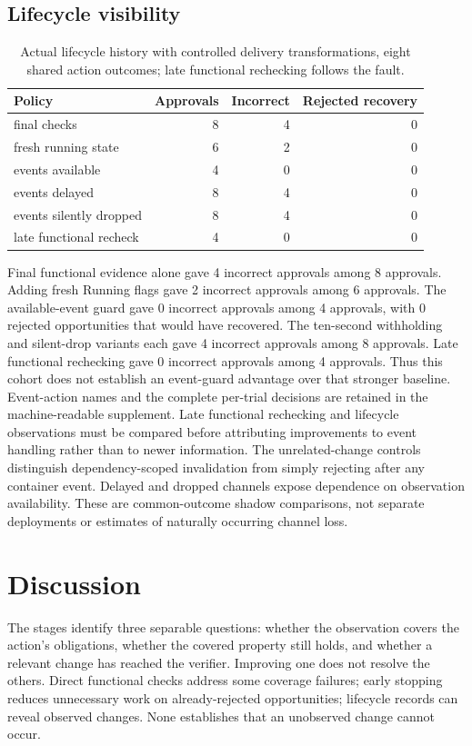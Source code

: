\documentclass[11pt]{article}
\begin{document}
\subsection{Lifecycle visibility}
\begin{table}[ht]
\centering\small
\begin{tabular}{lrrr}
\toprule
Policy & Approvals & Incorrect & Rejected recovery \\
\midrule
final checks & 8 & 4 & 0 \\
fresh running state & 6 & 2 & 0 \\
events available & 4 & 0 & 0 \\
events delayed & 8 & 4 & 0 \\
events silently dropped & 8 & 4 & 0 \\
late functional recheck & 4 & 0 & 0 \\
\bottomrule
\end{tabular}
\caption{Actual lifecycle history with controlled delivery transformations, eight shared action outcomes; late functional rechecking follows the fault.}
\end{table}
Final functional evidence alone gave 4 incorrect approvals among 8 approvals. Adding fresh Running flags gave 2 incorrect approvals among 6 approvals. The available-event guard gave 0 incorrect approvals among 4 approvals, with 0 rejected opportunities that would have recovered. The ten-second withholding and silent-drop variants each gave 4 incorrect approvals among 8 approvals. Late functional rechecking gave 0 incorrect approvals among 4 approvals. Thus this cohort does not establish an event-guard advantage over that stronger baseline. Event-action names and the complete per-trial decisions are retained in the machine-readable supplement.
Late functional rechecking and lifecycle observations must be compared before attributing improvements to event handling rather than to newer information. The unrelated-change controls distinguish dependency-scoped invalidation from simply rejecting after any container event. Delayed and dropped channels expose dependence on observation availability. These are common-outcome shadow comparisons, not separate deployments or estimates of naturally occurring channel loss.

\section{Discussion}
The stages identify three separable questions: whether the observation covers the action's obligations, whether the covered property still holds, and whether a relevant change has reached the verifier. Improving one does not resolve the others. Direct functional checks address some coverage failures; early stopping reduces unnecessary work on already-rejected opportunities; lifecycle records can reveal observed changes. None establishes that an unobserved change cannot occur.
\end{document}
